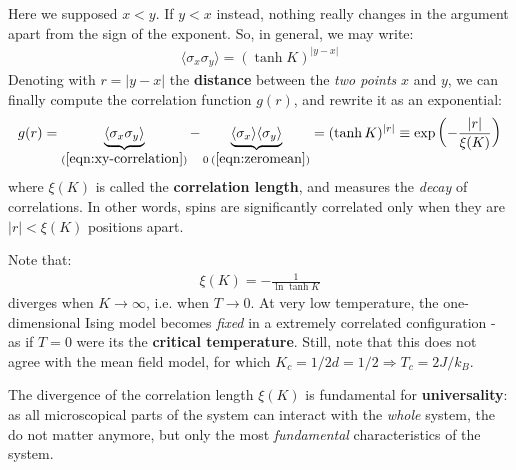 \documentclass[../../main.tex]{subfiles}
\begin{document}
Here we supposed $x < y$. If $y < x$ instead, nothing really changes in the argument apart from the sign of the exponent. So, in general, we may write:
\begin{align}\label{eqn:xy-correlation}
    \langle \sigma_x \sigma_y \rangle = (\tanh K)^{|y-x|}
\end{align}
Denoting with $r = |y-x|$ the \textbf{distance} between the \textit{two points} $x$ and $y$, we can finally compute the correlation function $g(r)$, and rewrite it as an exponential:
\begin{align}\label{eqn:2point-exp-behaviour}
    g(r) = \underbrace{\langle \sigma_x \sigma_y \rangle}_{(\ref{eqn:xy-correlation})}  - \underbrace{\langle \sigma_x \rangle \langle \sigma_y \rangle}_{0\>(\ref{eqn:zeromean})} = (\tanh K)^{|r|} \equiv \exp\left(-\frac{|r|}{\xi(K)} \right)
\end{align}
where $\xi(K)$ is called the \textbf{correlation length}, and measures the \textit{decay} of correlations. In other words, spins are significantly correlated only when they are $|r| < \xi(K)$ positions apart. 

\medskip

Note that:
\begin{align*}
    \xi(K) = - \frac{1}{\ln \tanh K}  
\end{align*}
diverges when $K \to \infty$, i.e. when $T \to 0$. At very low temperature, the one-dimensional Ising model becomes \textit{fixed} in a extremely correlated configuration - as if $T=0$ were its the \textbf{critical temperature}. Still, note that this does not agree with the mean field model, for which $K_c = 1/2d = 1/2 \Rightarrow T_c = 2 J /k_B$. 

\medskip

The divergence of the correlation length $\xi(K)$ is fundamental for \textbf{universality}: as all microscopical parts of the system can interact with the \textit{whole} system, the  do not matter anymore, but only the most \textit{fundamental} characteristics of the system.
\end{document}
